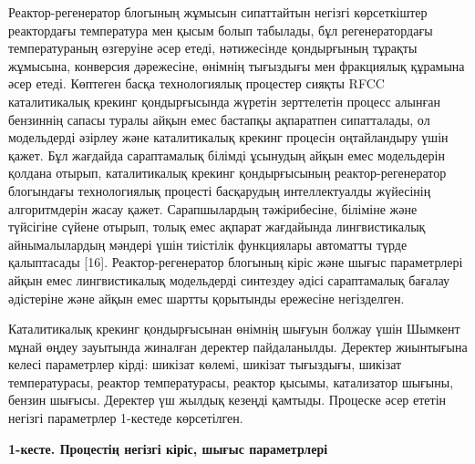 Реактор-регенератор блогының жұмысын сипаттайтын негізгі көрсеткіштер
реактордағы температура мен қысым болып табылады, бұл регенератордағы
температураның өзгеруіне әсер етеді, нәтижесінде қондырғының тұрақты
жұмысына, конверсия дәрежесіне, өнімнің тығыздығы мен фракциялық
құрамына әсер етеді. Көптеген басқа технологиялық процестер сияқты RFCC
каталитикалық крекинг қондырғысында жүретін зерттелетін процесс алынған
бензиннің сапасы туралы айқын емес бастапқы ақпаратпен сипатталады, ол
модельдерді әзірлеу және каталитикалық крекинг процесін оңтайландыру
үшін қажет. Бұл жағдайда сараптамалық білімді ұсынудың айқын емес
модельдерін қолдана отырып, каталитикалық крекинг қондырғысының
реактор-регенератор блогындағы технологиялық процесті басқарудың
интеллектуалды жүйесінің алгоритмдерін жасау қажет. Сарапшылардың
тәжірибесіне, біліміне және түйсігіне сүйене отырып, толық емес ақпарат
жағдайында лингвистикалық айнымалылардың мәндері үшін тиістілік
функциялары автоматты түрде қалыптасады {[}16{]}. Реактор-регенератор
блогының кіріс және шығыс параметрлері айқын емес лингвистикалық
модельдерді синтездеу әдісі сараптамалық бағалау әдістеріне және айқын
емес шартты қорытынды ережесіне негізделген.

Каталитикалық крекинг қондырғысынан өнімнің шығуын болжау үшін Шымкент
мұнай өңдеу зауытында жиналған деректер пайдаланылды. Деректер
жиынтығына келесі параметрлер кірді: шикізат көлемі, шикізат тығыздығы,
шикізат температурасы, реактор температурасы, реактор қысымы,
катализатор шығыны, бензин шығысы. Деректер үш жылдық кезеңді қамтыды.
Процеске әсер ететін негізгі параметрлер 1-кестеде көрсетілген.

{\bfseries 1-кесте. Процестің негізгі кіріс, шығыс параметрлері}

